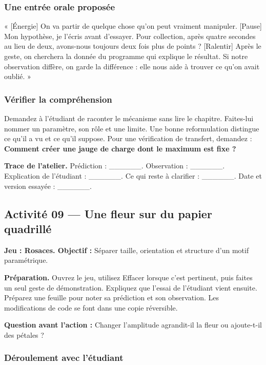 \documentclass[
  canadien,
  11pt,
  letterpaper,
]{article}
\begin{document}
\subsubsection{Une entrée orale
proposée}\label{une-entruxe9e-orale-proposuxe9e-7}

« {[}Énergie{]} On va partir de quelque chose qu'on peut vraiment
manipuler. {[}Pause{]} Mon hypothèse, je l'écris avant d'essayer. Pour
collection, après quatre secondes au lieu de deux, avons-nous toujours
deux fois plus de points ? {[}Ralentir{]} Après le geste, on cherchera
la donnée du programme qui explique le résultat. Si notre observation
diffère, on garde la différence : elle nous aide à trouver ce qu'on
avait oublié. »

\subsubsection{Vérifier la
compréhension}\label{vuxe9rifier-la-compruxe9hension-7}

Demandez à l'étudiant de raconter le mécanisme sans lire le chapitre.
Faites-lui nommer un paramètre, son rôle et une limite. Une bonne
reformulation distingue ce qu'il a vu et ce qu'il suppose. Pour une
vérification de transfert, demandez : \textbf{Comment créer une jauge de
charge dont le maximum est fixe ?}

\textbf{Trace de l'atelier.} Prédiction : \_\_\_\_\_\_. Observation :
\_\_\_\_\_\_. Explication de l'étudiant : \_\_\_\_\_\_. Ce qui reste à
clarifier : \_\_\_\_\_\_. Date et version essayée : \_\_\_\_\_\_.

\subsection{Activité 09 --- Une fleur sur du papier
quadrillé}\label{activituxe9-09-une-fleur-sur-du-papier-quadrilluxe9}

\textbf{Jeu : Rosaces. Objectif :} Séparer taille, orientation et
structure d'un motif paramétrique.

\textbf{Préparation.} Ouvrez le jeu, utilisez Effacer lorsque c'est
pertinent, puis faites un seul geste de démonstration. Expliquez que
l'essai de l'étudiant vient ensuite. Préparez une feuille pour noter sa
prédiction et son observation. Les modifications de code se font dans
une copie réversible.

\textbf{Question avant l'action :} Changer l'amplitude agrandit-il la
fleur ou ajoute-t-il des pétales ?

\subsubsection{Déroulement avec
l'étudiant}\label{duxe9roulement-avec-luxe9tudiant-8}
\end{document}
